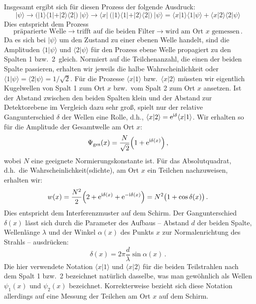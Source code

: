 Insgesamt ergibt sich f\"ur diesen Prozess der folgende Ausdruck:
\begin{equation}
    |\psi \rangle \longrightarrow  \big( |1\rangle \langle 1| + |2\rangle \langle 2|\big)~ |\psi\rangle \longrightarrow
       \langle x |~\big( |1\rangle \langle 1| + |2\rangle \langle 2|\big) ~ |\psi\rangle =
       \langle x |1\rangle \langle 1| \psi \rangle + \langle x |2\rangle \langle 2|\psi\rangle 
\end{equation}
Dies entspricht dem Prozess
\begin{equation}
  \mbox{pr\"aparierte Welle} \longrightarrow \mbox{trifft auf die beiden Filter} \longrightarrow 
      \mbox{wird am Ort $x$ gemessen} \, .
\end{equation}
Da es sich bei $|\psi\rangle$ um den Zustand zu einer ebenen Welle handelt, sind die
Amplituden $\langle 1|\psi\rangle$ und $\langle 2|\psi\rangle$ f\"ur den Prozess \glqq ebene Welle
propagiert zu den Spalten 1 bzw.\ 2\grqq\ gleich. Normiert auf die Teilchenanzahl, die einen der
beiden Spalte passieren, erhalten wir jeweils die halbe Wahrscheinlichkeit oder
$\langle 1|\psi\rangle=\langle 2|\psi\rangle = 1/\sqrt{2}$. F\"ur die Prozesse $\langle x| 1 \rangle$ bzw.\
$\langle x|2\rangle$ m\"ussten wir eigentlich Kugelwellen von Spalt 1 zum Ort $x$ bzw.\ vom Spalt 2 zum
Ort $x$ ansetzen. Ist der Abstand zwischen den beiden Spalten klein und der Abstand zur
Detektorebene im Vergleich dazu sehr gro\ss, spielt
nur der relative Gangunterschied $\delta$ der Wellen eine Rolle, d.h., 
$\langle x|2\rangle ={\rm e}^{{\rm i}\delta} \langle x|1\rangle$. Wir erhalten so f\"ur die Amplitude der Gesamtwelle
am Ort $x$:
\begin{equation}
             \Psi_{\rm ges}(x) = \frac{N}{\sqrt{2}} \Big( 1 + {\rm e}^{{\rm i}\delta(x)} \Big) \, , 
\end{equation} 
wobei $N$ eine geeignete Normierungskonstante ist. F\"ur das Absolutquadrat, d.h.\ die
Wahrscheinlichkeit(sdichte), am Ort $x$ ein Teilchen nachzuweisen, erhalten wir:
\begin{equation}
             w(x) = \frac{N^2}{2} \Big( 2 + {\rm e}^{{\rm i}\delta(x)} + {\rm e}^{-{\rm i}\delta(x)} \Big)
                  = N^2 \big( 1 + \cos \delta(x) \big)   \, . 
\end{equation} 
Dies entspricht dem Interferenzmuster auf dem Schirm. Der Gangunterschied $\delta(x)$ l\"asst sich durch 
die Parameter des Aufbaus -- Abstand $d$ der beiden Spalte, Wellenl\"ange $\lambda$ und
der Winkel $\alpha(x)$ des Punkts $x$ zur Normalenrichtung des Strahls -- ausdr\"ucken: 
\begin{equation}
             \delta(x) = 2\pi \frac{d}{\lambda} \sin \alpha(x) \, . 
\end{equation} 
Die hier verwendete Notation $\langle x|1\rangle$ und $\langle x|2\rangle$ f\"ur die beiden Teilstrahlen
nach dem Spalt 1 bzw.\ 2 bezeichnet nat\"urlich dasselbe, was man gew\"ohnlich als Wellen
$\psi_1(x)$ und $\psi_2(x)$ bezeichnet. Korrekterweise bezieht sich diese Notation allerdings auf 
eine Messung der Teilchen am Ort $x$ auf dem Schirm. 

